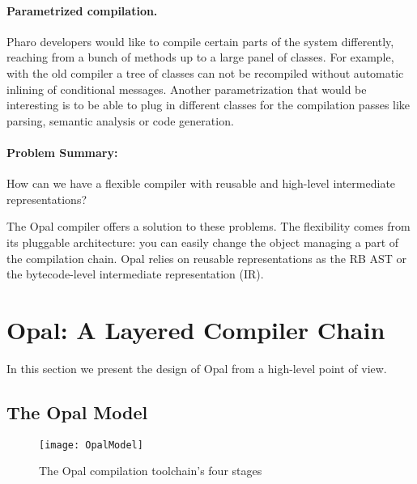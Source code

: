 \documentclass[preprint,10pt]{sigplanconf}
\begin{document}
\paragraph{Parametrized compilation.} 
Pharo developers would like to compile certain parts of the system differently, reaching from a bunch of methods up to a large panel of classes.
For example, with the old compiler a tree of classes can not be recompiled without automatic inlining of conditional messages.
Another parametrization that would be interesting is to be able to plug in different classes for the compilation passes like parsing, semantic analysis or code generation.



\paragraph{Problem Summary:}
How can we have a flexible compiler with reusable and high-level intermediate representations?

The Opal compiler offers a solution to these problems. The flexibility comes from its pluggable architecture: you can easily change the object managing a part of the compilation chain. Opal relies on reusable representations as the RB AST or the bytecode-level intermediate representation (IR). 

\section{Opal: A Layered Compiler Chain}
\label{sec:contribution}

In this section we present the design of Opal from a high-level point of view.

\subsection{The Opal Model}

\begin{figure}[ht]
\begin{center}
	\texttt{[image: OpalModel]}
	\caption{The Opal compilation toolchain's four stages}
\end{center}
\end{figure}
\end{document}
